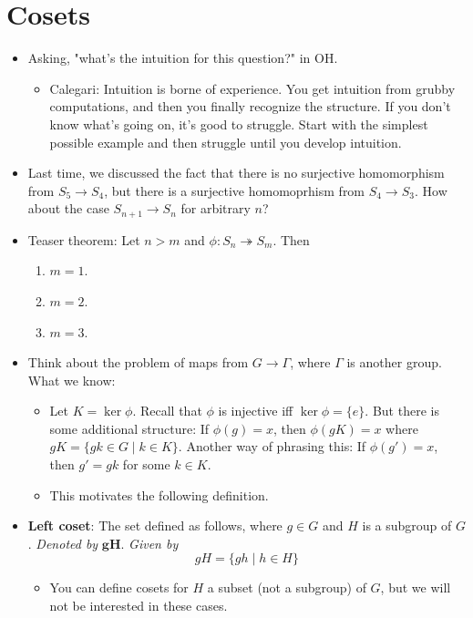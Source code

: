 \documentclass[../notes.tex]{subfiles}
\begin{document}
\section{Cosets}
\begin{itemize}
    \item {}Asking, "what's the intuition for this question?" in OH.
    \begin{itemize}
        \item Calegari: Intuition is borne of experience. You get intuition from grubby computations, and then you finally recognize the structure. If you don't know what's going on, it's good to struggle. Start with the simplest possible example and then struggle until you develop intuition.
    \end{itemize}
    \item Last time, we discussed the fact that there is no surjective homomorphism from $S_5\to S_4$, but there is a surjective homomoprhism from $S_4\to S_3$. How about the case $S_{n+1}\to S_n$ for arbitrary $n$?
    \item Teaser theorem: Let $n>m$ and $\phi:S_n\twoheadrightarrow S_m$. Then
    \begin{enumerate}
        \item $m=1$.
        \item $m=2$.
        \item $m=3$.
    \end{enumerate}
    \item Think about the problem of maps from $G\to\Gamma$, where $\Gamma$ is another group. What we know:
    \begin{itemize}
        \item Let $K=\ker\phi$. Recall that $\phi$ is injective iff $\ker\phi=\{e\}$. But there is some additional structure: If $\phi(g)=x$, then $\phi(gK)=x$ where $gK=\{gk\in G\mid k\in K\}$. Another way of phrasing this: If $\phi(g')=x$, then $g'=gk$ for some $k\in K$.
        \item This motivates the following definition.
    \end{itemize}
    \item \textbf{Left coset}: The set defined as follows, where $g\in G$ and $H$ is a subgroup of $G$. \emph{Denoted by} $\bm{gH}$. \emph{Given by}
    \begin{equation*}
        gH = \{gh\mid h\in H\}
    \end{equation*}
    \begin{itemize}
        \item You can define cosets for $H$ a subset (not a subgroup) of $G$, but we will not be interested in these cases.

\end{itemize}
\end{itemize}
\end{document}
